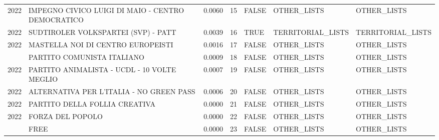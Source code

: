 \begin{longtable}[t]{rlrrlll}
2022 & IMPEGNO CIVICO LUIGI DI MAIO - CENTRO DEMOCRATICO & 0.0060 & 15 & FALSE & OTHER\_LISTS & OTHER\_LISTS\\
2022 & SUDTIROLER VOLKSPARTEI (SVP) - PATT & 0.0039 & 16 & TRUE & TERRITORIAL\_LISTS & TERRITORIAL\_LISTS\\
2022 & MASTELLA NOI DI CENTRO EUROPEISTI & 0.0016 & 17 & FALSE & OTHER\_LISTS & OTHER\_LISTS\\
\addlinespace
2022 & PARTITO COMUNISTA ITALIANO & 0.0009 & 18 & FALSE & OTHER\_LISTS & OTHER\_LISTS\\
2022 & PARTITO ANIMALISTA - UCDL - 10 VOLTE MEGLIO & 0.0007 & 19 & FALSE & OTHER\_LISTS & OTHER\_LISTS\\
2022 & ALTERNATIVA PER L'ITALIA - NO GREEN PASS & 0.0006 & 20 & FALSE & OTHER\_LISTS & OTHER\_LISTS\\
2022 & PARTITO DELLA FOLLIA CREATIVA & 0.0000 & 21 & FALSE & OTHER\_LISTS & OTHER\_LISTS\\
2022 & FORZA DEL POPOLO & 0.0000 & 22 & FALSE & OTHER\_LISTS & OTHER\_LISTS\\
\addlinespace
2022 & FREE & 0.0000 & 23 & FALSE & OTHER\_LISTS & OTHER\_LISTS\\
\bottomrule
\end{longtable}
